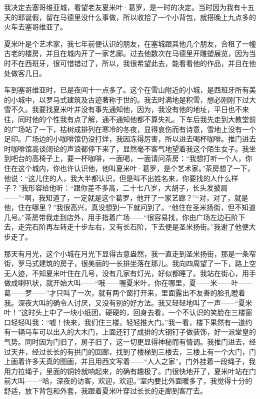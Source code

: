 \par 我决定去塞哥维亚城，看望老友夏米叶·葛罗，是一时的决定。当时因为我有十五天的耶诞假，留在马德里没什么事做，所以收拾了一个小背包，就搭晚上九点多的火车去塞哥维亚了。
\par 夏米叶是个艺术家，我七年前便认识的朋友，在塞城跟其他几个朋友，合租了一幢古老的楼房，并且在城内开了一家艺廊。过去他数次在马德里开雕塑展览，因为当时不在西班牙，很可惜错过了，所以，我很希望此去，能看看他的作品，并且在他处做客几日。
\par 车到塞哥维亚时，已是夜间十一点多了。这个在雪山附近的小城，是西班牙所有美的小城中，以罗马式建筑及古迹著称于世的。我去时满地是积雪，想必刚刚下过大雪不久。我要找夏米叶并没有事先通知他，因为，我没有他的地址，平日也不来往，同时他的个性我有点了解，通不通知他都不算失礼。下车后我先走到大教堂前的广场站了一下，枯树成排列在寒冷的冬夜，显得哀伤而有诗意，雪地上没有一个足印。广场边的小咖啡馆仍没打烊，我因冻得厉害，所以进去喝杯咖啡。推门进去时咖啡馆高谈阔论的声浪都停下来了，显然毫不客气地望着我这个陌生女子。我坐到吧台的高椅子上，要一杯咖啡，一面喝，一面请问茶房：“我想打听一个人，你住在这个城内，你也许认识他，他叫夏米叶·葛罗，是个艺术家。”茶房想了一下，他说：“这儿住的人，我大半都认识，但是叫不出姓名来，你要找的人什么样子？”我形容给他听：“跟你差不多高，二十七八岁，大胡子，长头发披肩——”“啊，我知道了，一定就是这个葛罗，他开了一家艺廊？”“对，对了，就是他，住在哪里？”我很高兴，真没想到一下就问到了。“他住在圣米扬街，但不知道几号。”茶房带我走到店外，用手指着广场——“很容易找，你由广场左边石阶下去，走完石阶再左转走十步左右，又有长石阶，下去便是圣米扬街。”我谢了他便大步走了。
\par 那天有月光，这个小城在月光下显得古意盎然，我一直走到圣米扬街，那是一条窄街，罗马式建筑的房子，很美丽的一长排坐落在那儿。我向四周望了一下，路上空无人迹，不知夏米叶住在几号，没有几家有灯光，好似都睡了。我站在街心，用手做成喇叭状，就开始大叫——“哦——喔夏米叶，你在哪里，夏——米——叶——葛——罗——”才只叫了一次，就有两个窗打开来，里面露出不友善的脸孔瞪着我。深夜大叫的确令人讨厌，又没有别的好方法。我又轻轻地叫了一声——“夏米叶！”这时头上中了一块小纸团，硬硬的，回身去看，一个不认识的笑脸在三楼窗口轻轻叫我：“嘘！快来，我们住三楼，轻轻推大门。”我一看，楼下果然有一道约有一辆马车可以出入的大木门，上面还钉了成排的大钢钉子做装饰，好一派堂皇的气势。同时因为门旧了，房子旧了，这一切更显得神秘而有情调。我推门进去，经过天井，经过长长的有拱门的回廊，找到了楼梯到三楼去，三楼上有一个大门，门上画着许多天真的图画，并且用西文写着——“人人之家”。门外挂着一段绳子，我用力拉绳子，里面的铜铃就响起来，的确有趣极了。门很快地开了，夏米叶站在门前大叫——“哈，深夜的访客，欢迎，欢迎。”室内要比外面暖多了，我觉得十分的舒适，放下背包和外套，我跟着夏米叶穿过长长的走廊到客厅去。
